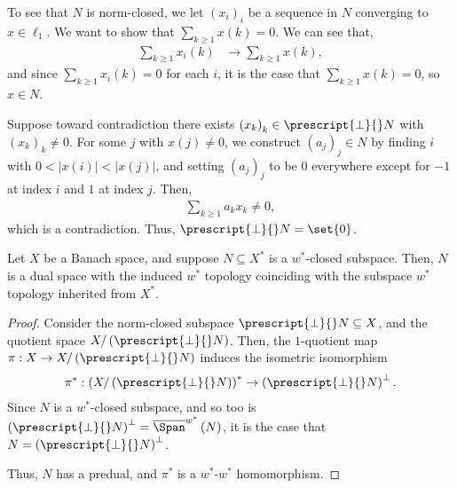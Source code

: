 \documentclass[10pt]{mypackage}
\begin{document}
\begin{solution}
  To see that $N$ is norm-closed, we let $\left(x_i\right)_i$ be a sequence in $N$ converging to $x\in \ell_1$. We want to show that $\sum_{k\geq 1}x(k) = 0$. We can see that,
  \begin{align*}
    \sum_{k\geq 1}x_i(k) &\rightarrow \sum_{k\geq 1}x(k),
  \end{align*}
  and since $\sum_{k\geq 1}x_i(k) = 0$ for each $i$, it is the case that $\sum_{k\geq 1}x(k) = 0$, so $x\in N$.\newline

  Suppose toward contradiction there exists $\left(x_k\right)_k\in \prescript{\perp}{}N$ with $\left(x_k\right)_k\neq 0$. For some $j$ with $x(j) \neq 0$, we construct $\left(a_j\right)_j\in N$ by finding $i$ with $0 < \left\vert x(i) \right\vert < \left\vert x(j) \right\vert$, and setting $\left(a_j\right)_j$ to be $0$ everywhere except for $-1$ at index $i$ and $1$ at index $j$. Then,
  \begin{align*}
    \sum_{k\geq 1}a_kx_k \neq 0,
  \end{align*}
  which is a contradiction. Thus, $\prescript{\perp}{}N = \set{0}$.
\end{solution}
\begin{proposition}
  Let $X$ be a Banach space, and suppose $N\subseteq X^{\ast}$ is a $w^{\ast}$-closed subspace. Then, $N$ is a dual space with the induced $w^{\ast}$ topology coinciding with the subspace $w^{\ast}$ topology inherited from $X^{\ast}$.
\end{proposition}
\begin{proof}
  Consider the norm-closed subspace $\prescript{\perp}{}N\subseteq X$, and the quotient space $X/\left(\prescript{\perp}{}N\right)$. Then, the $1$-quotient map $\pi: X\rightarrow X/\left(\prescript{\perp}{}N\right)$ induces the isometric isomorphism
  \begin{align*}
    \pi^{\ast}: \left(X/\left(\prescript{\perp}{}N\right)\right)^{\ast}\rightarrow \left(\prescript{\perp}{}N\right)^{\perp}.
  \end{align*}
  Since $N$ is a $w^{\ast}$-closed subspace, and so too is $\left(\prescript{\perp}{}N\right)^{\perp} = \overline{\Span}^{w^{\ast}}\left(N\right)$, it is the case that $N = \left(\prescript{\perp}{}N\right)^{\perp}$.\newline

  Thus, $N$ has a predual, and $\pi^{\ast}$ is a $w^{\ast}$-$w^{\ast}$ homomorphism.
\end{proof}
\end{document}
